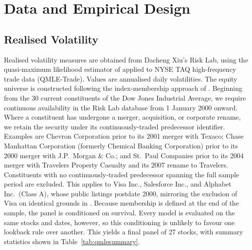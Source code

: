 \documentclass[12pt]{article}
\begin{document}
\section{Data and Empirical Design}

\subsection{Realised Volatility}

Realised volatility measures are obtained from Dacheng Xiu's Risk Lab, using the quasi-maximum likelihood estimator of \textcite{xiu-2010} applied to NYSE TAQ high-frequency trade data (QMLE-Trade). Values are annualised daily volatilities. The equity universe is constructed following the index-membership approach of \textcite{christensen-2022}. Beginning from the 30 current constituents of the Dow Jones Industrial Average, we require continuous availability in the Risk Lab database from 1 January 2000 onward. Where a constituent has undergone a merger, acquisition, or corporate rename, we retain the security under its continuously-traded predecessor identifier. Examples are Chevron Corporation prior to its 2001 merger with Texaco; Chase Manhattan Corporation (formerly Chemical Banking Corporation) prior to its 2000 merger with J.P.~Morgan \& Co.; and St.~Paul Companies prior to its 2004 merger with Travelers Property Casualty and its 2007 rename to Travelers. Constituents with no continuously-traded predecessor spanning the full sample period are excluded. This applies to Visa Inc., Salesforce Inc., and Alphabet Inc.\ (Class A), whose public listings postdate 2000, mirroring the exclusion of Visa on identical grounds in \textcite{christensen-2022}. Because membership is defined at the end of the sample, the panel is conditioned on survival. Every model is evaluated on the same stocks and dates, however, so this conditioning is unlikely to favour one lookback rule over another. This yields a final panel of 27 stocks, with summary statistics shown in Table~\ref{tab:qmlesummary}.
\end{document}
